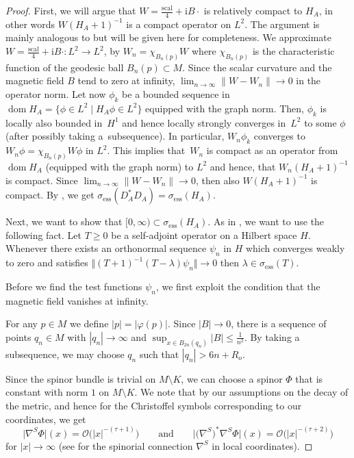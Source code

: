 \documentclass[10pt,a4paper]{amsart}
\numberwithin{equation}{section}
\begin{document}
\begin{proof}First, we will argue that $W=\frac{\mathrm{scal}}{4}+{\mathrm{i}}B\cdot $ is relatively compact to $H_A$, in other words $W(H_A+1)^{-1}$ is a compact operator on $L^2$. The argument is mainly analogous to \cite[Example~6, p.~117 and Problem 41, p.~369]{RS4} but will be given here for completeness. We approximate $W=\frac{\mathrm{scal}}{4}+{\mathrm{i}}B\cdot\colon L^2\to L^2$, by $W_n = \chi_{B_n(p)} W$ where $\chi_{B_n(p)}$ is the characteristic function of the geodesic ball $B_n(p)\subset M$. Since the scalar curvature and the magnetic field $B$ tend to zero at infinity, $\lim_{n\to \infty} \|W- W_n\| \to 0$ in the operator norm. Let now $\phi_k$ be a bounded sequence in $\operatorname{dom} H_A=\{\phi\in L^2\mid H_A\phi\in L^2\}$ equipped with the graph norm. Then, $\phi_k$ is locally also bounded in~$H^1$ and hence locally strongly converges in~$L^2$ to some $\phi$ (after possibly taking a~subsequence). In particular, $W_n\phi_k$ converges to $W_n \phi=\chi_{B_n(p)} W \phi$ in $L^2$. This implies that~$W_n$ is compact as an operator from $\operatorname{dom}H_A$ (equipped with the graph norm) to $L^2$ and hence, that $W_n(H_A+1)^{-1}$ is compact. Since $\lim_{n\to \infty} \|W- W_n\| \to 0$, then also $W(H_A+1)^{-1}$ is compact. By \cite[Corollary 2, p.~113]{RS4}, we get $\sigma_{\text{ess}} (D_A^*D_A) = \sigma_{\text{ess}} (H_A)$.
	
Next, we want to show that $[0, \infty)\subset \sigma_{\text{ess}} (H_A)$. As in \cite[Step~3, p.~117]{CFKS}, we want to use the following fact. Let $T\geq 0$ be a self-adjoint operator on a Hilbert space $H$. Whenever there exists an orthonormal sequence $\psi_n$ in $H$ which converges weakly to zero and satisfies $\bigl\Vert (T+1)^{-1}(T-\lambda)\psi_n\bigr\Vert\to 0$ then $\lambda\in \sigma_{\text{ess}}(T)$.
		
Before we find the test functions $\psi_n$, we first exploit the condition that the magnetic field vanishes at infinity.
	
For any $p \in M$ we define $|p|=|\varphi(p)|$. Since $|B|\to 0$, there is a sequence of points $q_n\in M$ with $|q_n|\to \infty$ and $\sup_{x\in B_{2n}(q_n)} |B|\leq \frac{1}{n^2}$. By taking a subsequence, we may choose $q_n$ such that $|q_n|> 6n+R_o$.
	
Since the spinor bundle is trivial on $M\setminus K$, we can choose a spinor $\Phi$ that is constant with norm $1$ on $M\setminus K$. We note that by our assumptions on the decay of the metric, and hence for the Christoffel symbols corresponding to our coordinates, we get
\[\bigl| {\nabla}^S \Phi\bigr|(x)=\mathcal{O}\bigl(|x|^{-(\tau+1)}\bigr)\qquad \text{and}\qquad\bigl|\bigl(\nabla^S\bigr)^*\nabla^S \Phi\bigr|(x)= \mathcal{O}\bigl(|x|^{-(\tau+2)}\bigr)\] for $|x|\to \infty$ (see \cite[Section~4]{LM} for the spinorial connection $\nabla^S$ in local coordinates).
	

\end{proof}
\end{document}

